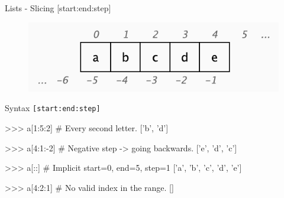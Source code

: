 \documentclass[10pt]{beamer}
\begin{document}
\begin{frame}[fragile]{Lists - Slicing [start:end:step]}

	\vspace*{-0.1cm}
	\begin{figure}[!h]
		\centering
		\includegraphics[width=0.55\linewidth]{img/slicing.pdf}
	\end{figure}

	\vspace*{-0.3cm}
	\pause
	Syntax \small{\texttt{[start:end:step]}}

	\pause
	\begin{pythoncode}
		>>> a[1:5:2]  # Every second letter.
		['b', 'd']
	\end{pythoncode}

	\pause
	\begin{pythoncode}
		>>> a[4:1:-2]  # Negative step -> going backwards.
		['e', 'd', 'c']
	\end{pythoncode}

	\pause
	\begin{pythoncode}
		>>> a[::]  # Implicit start=0, end=5, step=1
		['a', 'b', 'c', 'd', 'e']
	\end{pythoncode}

	\pause
	\begin{pythoncode}
		>>> a[4:2:1]  # No valid index in the range.
		[]
	\end{pythoncode}
\end{frame}
\end{document}
